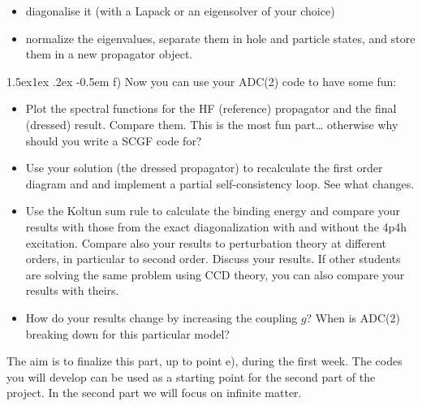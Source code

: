 \documentclass[%
twoside,                 %
final,                   %
10pt]{article}
\makeatletter
\newenvironment{doconceexercise}{}{}
\newcommand\subex{\@startsection{paragraph}{4}{\z@}%
                  {1.5ex\@plus1ex \@minus.2ex}%
                  {-0.5em}%
                  {\normalfont\normalsize\bfseries}}
\makeatother
\begin{document}
\begin{doconceexercise}
\begin{itemize}
 \item diagonalise it (with a Lapack or an eigensolver of your choice)

 \item normalize the eigenvalues, separate them in hole and particle states, and store them in a new propagator object.
\end{itemize}

\noindent
\subex{f)}
Now you can use your ADC(2) code to have some fun:
\begin{itemize}
  \item Plot the spectral functions for the HF (reference) propagator and the final (dressed) result. Compare them. This is the most fun part…  otherwise why should you write a SCGF code for?

  \item Use your solution (the dressed propagator) to recalculate the first order diagram and and implement a partial 
     self-consistency loop. See what changes.

  \item Use the Koltun sum rule to calculate the binding energy and compare your results with those from the exact diagonalization with and without the 4p4h excitation. Compare also your results to perturbation theory at different orders, in particular to second order. Discuss your results. If other students are solving the same problem using CCD theory, you can also compare your results with theirs.

  \item How do your results change by increasing the coupling $g$? When is ADC(2)  breaking down for this particular model?
\end{itemize}

\noindent
 The aim is to finalize this part, up to point e), during the first week. The codes you will develop can be used as a starting point for the second part of the project. In the second part we will focus on infinite matter.


\end{doconceexercise}
\end{document}
